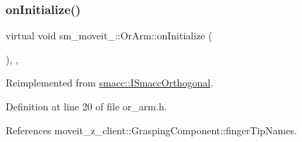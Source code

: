 \subsubsection{\texorpdfstring{on\+Initialize()}{onInitialize()}}
{\footnotesize\ttfamily virtual void sm\+\_\+moveit\+\_\+::\+Or\+Arm\+::on\+Initialize (\begin{DoxyParamCaption}{ }\end{DoxyParamCaption})\hspace{0.3cm}{\ttfamily [inline]}, {\ttfamily [override]}, {\ttfamily [virtual]}}



Reimplemented from \hyperlink{classsmacc_1_1ISmaccOrthogonal_a6bb31c620cb64dd7b8417f8705c79c7a}{smacc\+::\+I\+Smacc\+Orthogonal}.



Definition at line 20 of file or\+\_\+arm.\+h.



References moveit\+\_\+z\+\_\+client\+::\+Grasping\+Component\+::finger\+Tip\+Names.


